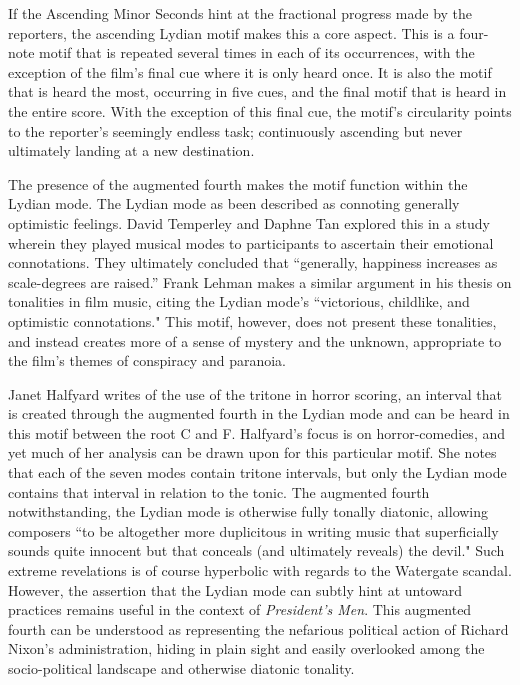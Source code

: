 If the Ascending Minor Seconds hint at the fractional progress made by the reporters, the ascending Lydian motif makes this a core aspect.
This is a four-note motif that is repeated several times in each of its occurrences, with the exception of the film's final cue where it is only heard once.
It is also the motif that is heard the most, occurring in five cues, and the final motif that is heard in the entire score.
With the exception of this final cue, the motif's circularity points to the reporter's seemingly endless task; continuously ascending but never ultimately landing at a new destination.

The presence of the augmented fourth makes the motif function within the Lydian mode.
The Lydian mode as been described as connoting generally optimistic feelings.
David Temperley and Daphne Tan explored this in a study wherein they played musical modes to participants to ascertain their emotional connotations.
They ultimately concluded that ``generally, happiness increases as scale-degrees are raised.”\autocites[][255]{temperley_emotional_2013}
Frank Lehman makes a similar argument in his thesis on tonalities in film music, citing the Lydian mode's ``victorious, childlike, and optimistic connotations."\autocites[][31]{lehman_reading_2012}
This motif, however, does not present these tonalities, and instead creates more of a sense of mystery and the unknown, appropriate to the film's themes of conspiracy and paranoia.

Janet Halfyard writes of the use of the tritone in horror scoring, an interval that is created through the augmented fourth in the Lydian mode and can be heard in this motif between the root C and F\sharp.
Halfyard's focus is on horror-comedies, and yet much of her analysis can be drawn upon for this particular motif.
She notes that each of the seven modes contain tritone intervals, but only the Lydian mode contains that interval in relation to the tonic.
The augmented fourth notwithstanding, the Lydian mode is otherwise fully tonally diatonic, allowing composers ``to be altogether more duplicitous in writing music that superficially sounds quite innocent but that conceals (and ultimately reveals) the devil."\autocites[][28]{halfyard_mischief_2010}
Such extreme revelations is of course hyperbolic with regards to the Watergate scandal.
However, the assertion that the Lydian mode can subtly hint at untoward practices remains useful in the context of \textit{President's Men}.
This augmented fourth can be understood as representing the nefarious political action of Richard Nixon's administration, hiding in plain sight and easily overlooked among the socio-political landscape and otherwise diatonic tonality.

